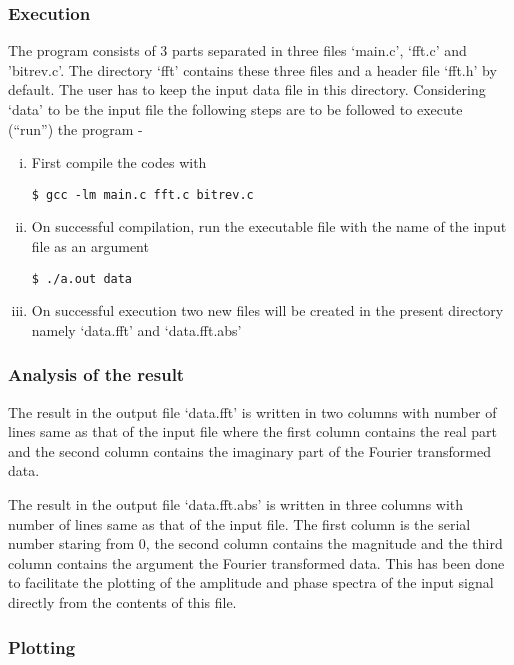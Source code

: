 \documentclass[a4paper,11pt]{report}
\begin{document}
\subsubsection{Execution}

The program consists of 3 parts separated in three files `main.c', `fft.c' and 'bitrev.c'. The directory `fft' contains these three files and a header file `fft.h' by default. The user has to keep the input data file in this directory. Considering `data' to be the input file the following steps are to be followed to execute (``run'') the program - 
	
\begin{enumerate}[(i)]
\item First compile the codes with
\begin{verbatim}
$ gcc -lm main.c fft.c bitrev.c
\end{verbatim}

\item On successful compilation, run the executable file with the name of the input file as an argument 

\begin{verbatim}
$ ./a.out data
\end{verbatim}

\item On successful execution two new files will be created in the present directory namely `data.fft' and `data.fft.abs'
\end{enumerate}

\subsubsection{Analysis of the result}
	
The result in the output file `data.fft' is written in two columns with number of lines same as that of the input file where the first column contains the real part and the second column contains the imaginary part of the Fourier transformed data.

The result in the output file `data.fft.abs' is written in three columns with number of lines same as that of the input file. The first column is the serial number staring from 0, the second column contains the magnitude and the third column contains the argument the Fourier transformed data. This has been done to facilitate the plotting of the amplitude and phase spectra of the input signal directly from the contents of this file.

\subsubsection{Plotting}
\end{document}
